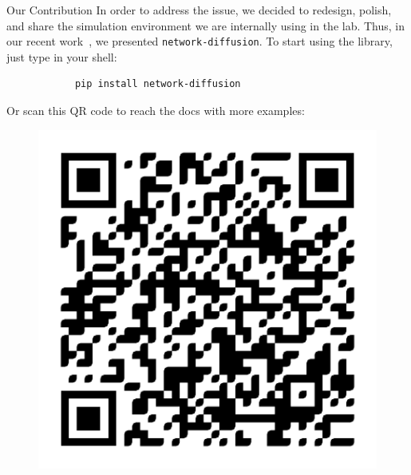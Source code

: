 \documentclass[final]{beamer}
\newlength{\colwidth}
\begin{document}
\begin{frame}[t, fragile]
\begin{columns}[t]
\begin{column}{\colwidth}
\begin{alertblock}{Our Contribution}
    In order to address the issue, we decided to redesign, polish, and share the simulation 
    environment we are internally using in the lab. Thus, in our recent
    work~\cite{czuba2024networkdiffusion}, we presented \lstinline[style=py]{network-diffusion}.
    To start using the library, just type in your shell:
    \begin{center}
        \large
        \begin{verbatim}
            pip install network-diffusion
        \end{verbatim}
    \end{center}
    \vspace{-1em}
    Or scan this QR code to reach the docs with more examples:
    \begin{figure}
        \includegraphics[width=15cm]{../presentation/figures/qr_code2.pdf}
    \end{figure}
\end{alertblock}


\end{column}
\end{columns}
\end{frame}
\end{document}
